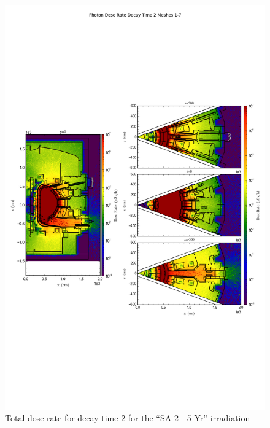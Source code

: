 \documentclass[12pt]{article}
\begin{document}
\begin{figure}[ht!]
\centering
\includegraphics[trim={0cm 8cm, 0cm 8cm},clip,scale=0.75]{../plots/final_model_with_b4c/10year/Photon_Dose_Rate_Decay_Time_2_Meshes_1-7.png}
\caption{Total dose rate for decay time 2 for the ``SA-2 - 5 Yr'' irradiation}
\label{fig:photons_10y_dc2_b4c_dose}
\end{figure}
\end{document}
